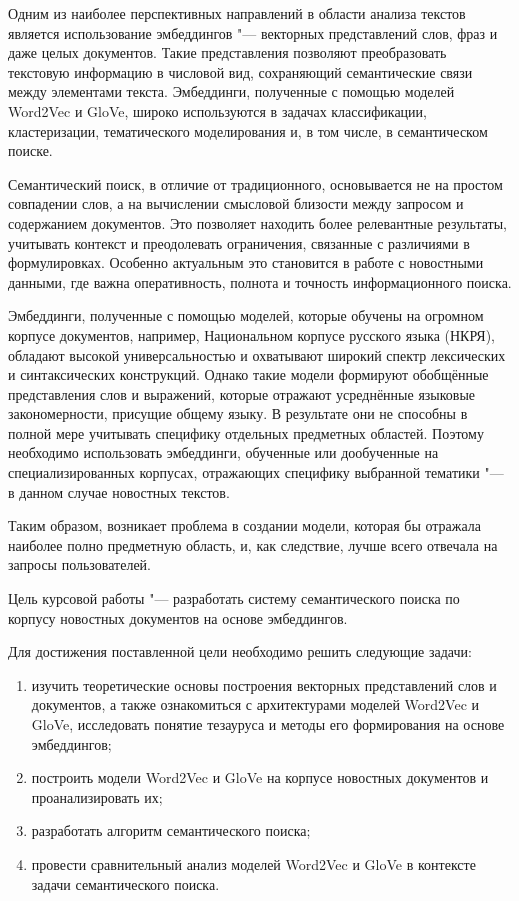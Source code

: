 \documentclass[coursework]{SCWorks}
\begin{document}
Одним из наиболее перспективных направлений в области анализа текстов является использование эмбеддингов "--- векторных представлений слов, фраз и даже целых документов. Такие представления позволяют преобразовать текстовую информацию в числовой вид, сохраняющий семантические связи между элементами текста. Эмбеддинги, полученные с помощью моделей Word2Vec и GloVe, широко используются в задачах классификации, кластеризации, тематического моделирования и, в том числе, в семантическом поиске.

Семантический поиск, в отличие от традиционного, основывается не на простом совпадении слов, а на вычислении смысловой близости между запросом и содержанием документов. Это позволяет находить более релевантные результаты, учитывать контекст и преодолевать ограничения, связанные с различиями в формулировках. Особенно актуальным это становится в работе с новостными данными, где важна оперативность, полнота и точность информационного поиска.

Эмбеддинги, полученные с помощью моделей, которые обучены на огромном корпусе документов, например, Национальном корпусе русского языка (НКРЯ), обладают высокой универсальностью и охватывают широкий спектр лексических и синтаксических конструкций. Однако такие модели формируют обобщённые представления слов и выражений, которые отражают усреднённые языковые закономерности, присущие общему языку. В результате они не способны в полной мере учитывать специфику отдельных предметных областей.
Поэтому необходимо использовать эмбеддинги, обученные или дообученные на специализированных корпусах, отражающих специфику выбранной тематики "--- в данном случае новостных текстов.

Таким образом, возникает проблема в создании модели, которая бы отражала наиболее полно предметную область, и, как следствие, лучше всего отвечала на запросы пользователей. 

Цель курсовой работы "--- разработать систему семантического поиска по корпусу новостных документов на основе эмбеддингов.

Для достижения поставленной цели необходимо решить следующие задачи:
\begin{enumerate}
    \item изучить теоретические основы построения векторных представлений слов и документов, а также ознакомиться с архитектурами моделей Word2Vec и GloVe, исследовать понятие тезауруса и методы его формирования на основе эмбеддингов;

    \item построить модели Word2Vec и GloVe на корпусе новостных документов и проанализировать их;

    \item разработать алгоритм семантического поиска;

    \item провести сравнительный анализ моделей Word2Vec и GloVe в контексте задачи семантического поиска.
\end{enumerate}
\end{document}
